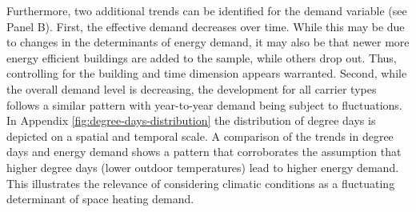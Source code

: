 \documentclass[12pt,twoside]{reedthesis}
\begin{document}
Furthermore, two additional trends can be identified for the demand variable (see Panel B). First, the effective demand decreases over time. While this may be due to changes in the determinants of energy demand, it may also be that newer more energy efficient buildings are added to the sample, while others drop out. Thus, controlling for the building and time dimension appears warranted. Second, while the overall demand level is decreasing, the development for all carrier types follows a similar pattern with year-to-year demand being subject to fluctuations. In Appendix \ref{fig:degree-days-distribution} the distribution of degree days is depicted on a spatial and temporal scale. A comparison of the trends in degree days and energy demand shows a pattern that corroborates the assumption that higher degree days (lower outdoor temperatures) lead to higher energy demand. This illustrates the relevance of considering climatic conditions as a fluctuating determinant of space heating demand.
\end{document}
